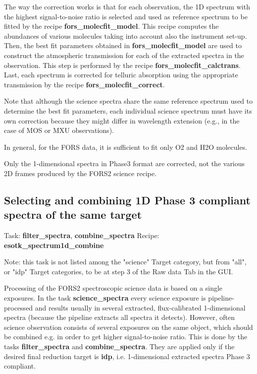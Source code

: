 The way the correction works is that for each observation, the 1D spectrum with the highest signal-to-noise ratio is selected and used as reference spectrum to be fitted by the recipe {\bf fors\_molecfit\_model}. This recipe computes the abundances
of various molecules taking into account also the instrument set-up. Then, the best fit parameters obtained in
{\bf fors\_molecfit\_model} are used to construct the atmospheric transmission for each of the extracted spectra
in the observation. This step is performed by the recipe {\bf fors\_molecfit\_calctrans}. Last, each spectrum
is corrected for telluric absorption using the appropriate transmission by the recipe {\bf fors\_molecfit\_correct}.

Note that although the science spectra share the same reference spectrum used to determine the best fit parameters, each individual science spectrum must have its own correction because they might differ in wavelength extension (e.g., in the case of MOS or MXU observations).

In general, for the FORS data, it is sufficient to fit only O2 and H2O molecules.

Only the 1-dimensional spectra in Phase3 format are corrected, not the various 2D frames produced by the FORS2 science recipe.


\subsection{Selecting and combining 1D Phase 3 compliant spectra of the same target}

Task: {\bf filter\_spectra}, {\bf combine\_spectra} Recipe: {\bf esotk\_spectrum1d\_combine}

Note: this task is not listed among the "science" Target category, but
from "all", or "idp" Target categories, to be at step 3 of the Raw
data Tab in the GUI.

Processing of the FORS2 spectroscopic science data is based 
on a single exposures. In the task {\bf science\_spectra} every science exposure is pipeline-processed and results usually 
in several extracted, flux-calibrated 1-dimensional spectra (because the pipeline extracts all spectra it detects). However, often science observation consists of several exposures on the same object, which should be combined e.g. in order to get higher signal-to-noise ratio. This is done by the tasks {\bf filter\_spectra} and {\bf combine\_spectra}.
They are applied only if the desired final reduction target is {\bf idp}, i.e. 1-dimensional extracted spectra Phase 3 compliant.

